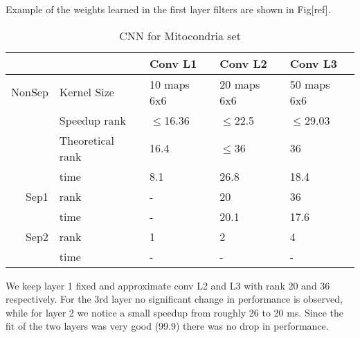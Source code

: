 Example of the weights learned in the first layer filters are shown in Fig[ref]. 

\begin{table}
\centering
\begin{tabular}{@{}rllll@{}}\toprule
 &&Conv L1& Conv L2 & Conv L3\\ \midrule
NonSep &Kernel Size & 10 maps 6x6& 20 maps 6x6 & 50 maps 6x6\\
&Speedup rank& $\leq$16.36 & $\leq$22.5 & $\leq$29.03\\
&Theoretical rank & 16.4 & $\leq$36 & 36 \\ 
&time & 8.1 & 26.8 & 18.4 \\ \midrule
Sep1& rank & - & 20 & 36 \\ 
& time& - & 20.1 & 17.6\\ \midrule
Sep2& rank & 1 & 2 & 4 \\ 
& time& - & - & -\\ \bottomrule
\end{tabular}
\caption{CNN for Mitocondria set}
\label{fig:CNN3}
\end{table}

We keep layer 1 fixed and approximate conv L2 and L3 with rank 20 and 36 respectively. For the 3rd layer no significant change in performance is observed, while for layer 2 we notice a small speedup from roughly 26 to 20 ms. Since the fit of the two layers was very good (99.9) there was no drop in performance.